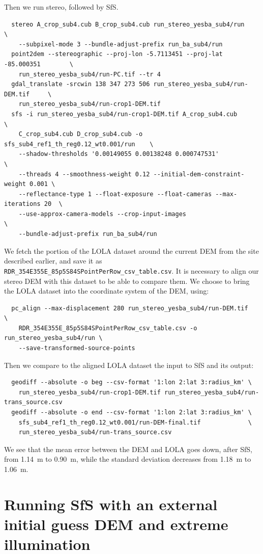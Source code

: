 Then we run stereo, followed by SfS. 
\begin{verbatim}
  stereo A_crop_sub4.cub B_crop_sub4.cub run_stereo_yesba_sub4/run             \
    --subpixel-mode 3 --bundle-adjust-prefix run_ba_sub4/run
  point2dem --stereographic --proj-lon -5.7113451 --proj-lat -85.000351        \
    run_stereo_yesba_sub4/run-PC.tif --tr 4
  gdal_translate -srcwin 138 347 273 506 run_stereo_yesba_sub4/run-DEM.tif     \
    run_stereo_yesba_sub4/run-crop1-DEM.tif 
  sfs -i run_stereo_yesba_sub4/run-crop1-DEM.tif A_crop_sub4.cub               \
    C_crop_sub4.cub D_crop_sub4.cub -o sfs_sub4_ref1_th_reg0.12_wt0.001/run    \
    --shadow-thresholds '0.00149055 0.00138248 0.000747531'                    \
    --threads 4 --smoothness-weight 0.12 --initial-dem-constraint-weight 0.001 \
    --reflectance-type 1 --float-exposure --float-cameras --max-iterations 20  \
    --use-approx-camera-models --crop-input-images                             \
    --bundle-adjust-prefix run_ba_sub4/run
\end{verbatim}

We fetch the portion of the LOLA dataset around the current DEM from the
site described earlier, and save it as
\verb#RDR_354E355E_85p5S84SPointPerRow_csv_table.csv#. It is necessary
to align our stereo DEM with this dataset to be able to compare
them. We choose to bring the LOLA dataset into the coordinate system
of the DEM, using:
\begin{verbatim}
  pc_align --max-displacement 280 run_stereo_yesba_sub4/run-DEM.tif             \
    RDR_354E355E_85p5S84SPointPerRow_csv_table.csv -o run_stereo_yesba_sub4/run \
    --save-transformed-source-points
\end{verbatim}

Then we compare to the aligned LOLA dataset the input to SfS and its output:
\begin{verbatim}
  geodiff --absolute -o beg --csv-format '1:lon 2:lat 3:radius_km' \
    run_stereo_yesba_sub4/run-crop1-DEM.tif run_stereo_yesba_sub4/run-trans_source.csv
  geodiff --absolute -o end --csv-format '1:lon 2:lat 3:radius_km' \
    sfs_sub4_ref1_th_reg0.12_wt0.001/run-DEM-final.tif             \
    run_stereo_yesba_sub4/run-trans_source.csv
\end{verbatim}

We see that the mean error between the DEM and LOLA goes down, after SfS,
from  1.14~m to 0.90~m, while the standard deviation decreases from
1.18~m to 1.06~m.

\section{Running SfS with an external initial guess DEM and extreme illumination}

